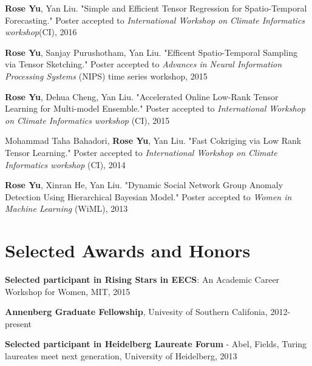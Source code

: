 \documentclass[margin,line]{res}
\begin{document}
\begin{resume}
{\bf Rose Yu}, Yan Liu. "Simple and Efficient Tensor Regression for Spatio-Temporal Forecasting." Poster accepted to \textit{International Workshop on Climate Informatics workshop}(CI), 2016

{\bf Rose Yu}, Sanjay Purushotham, Yan Liu. "Efficent Spatio-Temporal Sampling via Tensor Sketching." Poster accepted to \textit{Advances in Neural Information Processing Systems}  (NIPS) time series workshop, 2015   


{\bf Rose Yu}, Dehua Cheng, Yan Liu. "Accelerated Online Low-Rank Tensor Learning for Multi-model Ensemble." Poster accepted to \textit{International Workshop on Climate Informatics workshop} (CI), 2015

Mohammad Taha Bahadori, {\bf Rose Yu}, Yan Liu. "Fast Cokriging via Low Rank Tensor Learning." Poster accepted to \textit{International Workshop on Climate Informatics workshop} (CI), 2014

{\bf Rose Yu}, Xinran He, Yan Liu. "Dynamic Social Network Group Anomaly Detection Using Hierarchical Bayesian Model." Poster accepted to \textit{Women in Machine Learning } (WiML), 2013


\section{\sc Selected Awards and Honors} 


\textbf{Selected participant in Rising Stars in EECS}: An Academic Career Workshop for Women, MIT, 2015

\textbf{Annenberg Graduate Fellowship}, Univesity of Southern Califonia, 2012-present







%

\textbf{Selected participant in Heidelberg Laureate Forum }- Abel, Fields, Turing laureates meet next generation, University of Heidelberg, 2013



\end{resume}
\end{document}

